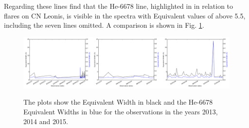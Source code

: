 Regarding these lines find that the He-6678
line, highlighted in \citet[fig. 8]{fuhrmeister08} in relation to flares on CN Leonis, is visible in the spectra with
{\ha} Equivalent values of above 5.5, including the seven lines omitted. A comparison is shown in Fig. \ref{fig:dualews}.

\begin{figure}[!htbp]
\begin{center}
\includegraphics[scale=0.18]{Figures/dualcomb.png} \\
\end{center}   
\caption{The plots show the {\ha} Equivalent Width in black and the He-6678 Equivalent Widths in blue for the {\harps}
  observations in the years 2013, 2014 and 2015.}
 \protect\label{fig:dualews}
\end{figure}
